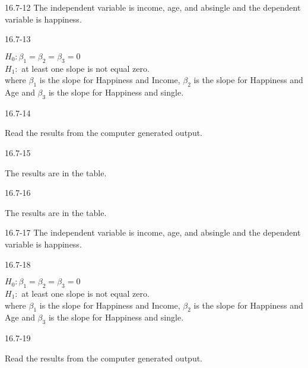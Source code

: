 \begin{exsol@solution}{16.7-12}
       The independent variable is income,   age, and absingle and the dependent variable is happiness.
\end{exsol@solution}
\begin{exsol@solution}{16.7-13}

       $H_0: \beta_1 = \beta_2 = \beta_3 = 0$ \\
       $H_1:$ at least one slope is not equal zero. \\
       where $\beta_1$ is the slope for Happiness and Income,  $\beta_2$ is the slope for Happiness and Age and $\beta_3$ is         the slope for Happiness and single.

\end{exsol@solution}
\begin{exsol@solution}{16.7-14}

       Read the results from the computer generated output.

\end{exsol@solution}
\begin{exsol@solution}{16.7-15}

      The results are in the table.

\end{exsol@solution}
\begin{exsol@solution}{16.7-16}

  The results are in the table.

\end{exsol@solution}
\begin{exsol@solution}{16.7-17}
       The independent variable is income,   age, and absingle and the dependent variable is happiness.
\end{exsol@solution}
\begin{exsol@solution}{16.7-18}

       $H_0: \beta_1 = \beta_2 = \beta_3 = 0$ \\
       $H_1:$ at least one slope is not equal zero. \\
       where $\beta_1$ is the slope for Happiness and Income,  $\beta_2$ is the slope for Happiness and Age and $\beta_3$ is         the slope for Happiness and single.

\end{exsol@solution}
\begin{exsol@solution}{16.7-19}

       Read the results from the computer generated output.

\end{exsol@solution}
